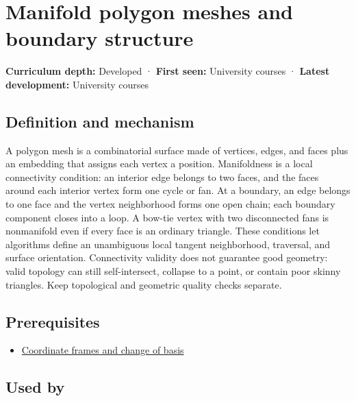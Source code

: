\hypertarget{appendix-fab348609369}{}\label{referencestart:appendix-fab348609369}
\section{Manifold polygon meshes and boundary structure}\label{appendix-fab348609369-manifold-polygon-meshes-and-boundary-structure}

\textbf{Curriculum depth:} Developed · \textbf{First seen:} University courses · \textbf{Latest development:} University courses

\subsection{Definition and mechanism}\label{appendix-fab348609369-definition-and-mechanism}

A polygon mesh is a combinatorial surface made of vertices, edges, and faces plus an embedding that assigns each vertex a position. Manifoldness is a local connectivity condition: an interior edge belongs to two faces, and the faces around each interior vertex form one cycle or fan. At a boundary, an edge belongs to one face and the vertex neighborhood forms one open chain; each boundary component closes into a loop. A bow-tie vertex with two disconnected fans is nonmanifold even if every face is an ordinary triangle. These conditions let algorithms define an unambiguous local tangent neighborhood, traversal, and surface orientation. Connectivity validity does not guarantee good geometry: valid topology can still self-intersect, collapse to a point, or contain poor skinny triangles. Keep topological and geometric quality checks separate.

\subsection{Prerequisites}\label{appendix-fab348609369-prerequisites}

\begin{itemize}
\tightlist
\item
  \hyperref[appendix-1bae9457dbc3]{Coordinate frames and change of basis}
\end{itemize}

\subsection{Used by}\label{appendix-fab348609369-used-by}

